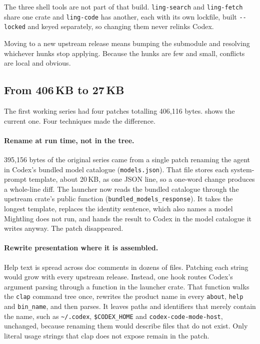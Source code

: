 \documentclass[11pt]{article}
\newcommand{\code}[1]{\texttt{#1}}
\begin{document}
The three shell tools are not part of that build. \code{ling-search} and \code{ling-fetch}
share one crate and \code{ling-code} has another, each with its own lockfile, built
\code{-{}-locked} and keyed separately, so changing them never relinks Codex.

Moving to a new upstream release means bumping the submodule and resolving whichever hunks stop
applying. Because the hunks are few and small, conflicts are local and obvious.

\subsection{From 406\,KB to 27\,KB}

The first working series had four patches totalling 406{,}116 bytes.  shows the
current one. Four techniques made the difference.

\paragraph{Rename at run time, not in the tree.} 395{,}156 bytes of the original series came from a
single patch renaming the agent in Codex's bundled model catalogue (\code{models.json}). That file
stores each system-prompt template, about 20\,KB, as one JSON line, so a one-word change produces a
whole-line diff. The launcher now reads the bundled catalogue through the upstream crate's public
function (\code{bundled\_models\_response}). It takes the longest template, replaces the identity
sentence, which also names a model Mightling does not run, and hands the result to Codex in the model
catalogue it writes anyway. The patch disappeared.

\paragraph{Rewrite presentation where it is assembled.} Help text is spread across doc comments in
dozens of files. Patching each string would grow with every upstream release. Instead, one hook
routes Codex's argument parsing through a function in the launcher crate. That function walks the
\code{clap} command tree once, rewrites the product name in every \code{about}, \code{help} and
\code{bin\_name}, and then parses. It leaves paths and identifiers that merely contain the name,
such as \code{\textasciitilde/.codex}, \code{\$CODEX\_HOME} and \code{codex-code-mode-host}, unchanged,
because renaming them would describe files that do not exist. Only literal usage strings that clap
does not expose remain in the patch.
\end{document}
